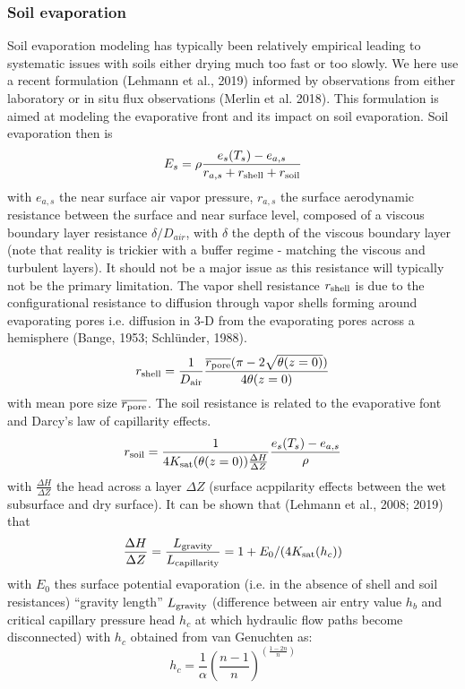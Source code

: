 \documentclass{report}
\begin{document}
\subsubsection{Soil evaporation}
Soil evaporation modeling has typically been relatively empirical leading to systematic issues with soils either drying much too fast or too slowly. We here use a recent formulation (Lehmann et al., 2019) informed by observations from either laboratory or in situ flux observations (Merlin et al. 2018). This formulation is aimed at modeling the evaporative front and its impact on soil evaporation. 
Soil evaporation then is 
\begin{equation}
    E_s = \rho \frac{e_s(T_s)-e_{a,s}}{r_{a,s}+r_{\rm shell}+r_{\rm soil}}
\end{equation}
with $e_{a,s}$ the near surface air vapor pressure, $r_{a,s}$ the surface aerodynamic resistance between the surface and near surface level, composed of a viscous boundary layer resistance $\delta /D_{air}$, with $\delta$ the depth of the viscous boundary layer (note that reality is trickier with a buffer regime - matching the viscous and turbulent layers). It should not be a major issue as this resistance will typically not be the primary limitation. The vapor shell resistance $r_{\rm shell}$ is due to the configurational resistance to diffusion through vapor shells forming around evaporating pores i.e. diffusion in 3-D from the evaporating pores across a hemisphere (Bange, 1953; Schlünder, 1988).
\begin{equation}
    r_{\rm shell} = \frac{1}{D_{\rm air}}\frac{\overline{r_{\rm pore}}(\pi-2\sqrt{\theta(z=0)})}{4\theta(z=0)}
\end{equation}
with mean pore size $\overline{r_{\rm pore}}$.
The soil resistance is related to the evaporative font and Darcy's law of capillarity effects.
\begin{equation}
    r_{\rm soil} = \frac{1}{4 K_{\mathrm{sat}}(\theta(z=0))\frac{\Delta H}{\Delta Z}}\frac{e_s(T_s)-e_{a,s}}{\rho}
\end{equation}
with $\frac{\Delta H}{\Delta Z}$ the head across a layer $\Delta Z$ (surface acppilarity effects between the wet subsurface and dry surface). It can be shown that (Lehmann et al., 2008; 2019) that 
\begin{equation}
   \frac{\Delta H}{\Delta Z} = \frac{L_{\rm gravity}}{L_{\rm capillarity}} = 1+E_0/(4K_{\mathrm{sat}}(h_c))
\end{equation}
with $E_0$ thes surface potential evaporation (i.e. in the absence of shell and soil resistances) “gravity length” $L_{\rm gravity}$ (difference between air entry value $h_b$ and critical capillary pressure head $h_c$ at which hydraulic flow paths become disconnected) with $h_c$ obtained from van Genuchten as:
\begin{equation}
   h_c = \frac{1}{\alpha}\left( \frac{n-1}{n} \right)^{\left( \frac{1-2n}{n} \right)}
\end{equation}
\end{document}
